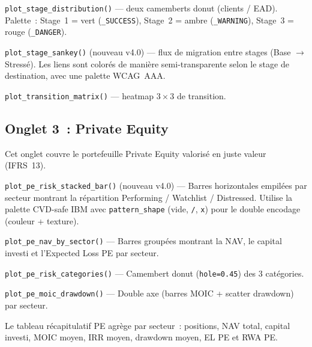 \documentclass[12pt,a4paper]{article}
\begin{document}
\begin{description}[leftmargin=1em]
    \item[Distribution des stages] \texttt{plot\_stage\_distribution()} --- deux camemberts donut (clients / EAD). Palette~: Stage~1 = vert (\texttt{\_SUCCESS}), Stage~2 = ambre (\texttt{\_WARNING}), Stage~3 = rouge (\texttt{\_DANGER}).
    \item[Diagramme Sankey] \texttt{plot\_stage\_sankey()} (nouveau v4.0) --- flux de migration entre stages (Base $\to$ Stress\'e). Les liens sont color\'es de mani\`ere semi-transparente selon le stage de destination, avec une palette WCAG~AAA.
    \item[Matrice de transition] \texttt{plot\_transition\_matrix()} --- heatmap $3 \times 3$ de transition.
\end{description}


\subsection{Onglet 3~: Private Equity}
\label{sec:tab3}

Cet onglet couvre le portefeuille Private Equity valoris\'e en juste valeur (IFRS~13).

\begin{description}[leftmargin=1em]
    \item[Barres empil\'ees CVD] \texttt{plot\_pe\_risk\_stacked\_bar()} (nouveau v4.0) --- Barres horizontales empil\'ees par secteur montrant la r\'epartition Performing / Watchlist / Distressed. Utilise la palette CVD-safe IBM avec \texttt{pattern\_shape} (vide, \texttt{/}, \texttt{x}) pour le double encodage (couleur + texture).
    \item[NAV par secteur] \texttt{plot\_pe\_nav\_by\_sector()} --- Barres group\'ees montrant la NAV, le capital investi et l'Expected Loss PE par secteur.
    \item[Classification IPEV] \texttt{plot\_pe\_risk\_categories()} --- Camembert donut (\texttt{hole=0.45}) des 3 cat\'egories.
    \item[MOIC \& Drawdown] \texttt{plot\_pe\_moic\_drawdown()} --- Double axe (barres MOIC + scatter drawdown) par secteur.
\end{description}

Le tableau r\'ecapitulatif PE agr\`ege par secteur~: positions, NAV total, capital investi, MOIC moyen, IRR moyen, drawdown moyen, EL PE et RWA PE.
\end{document}
